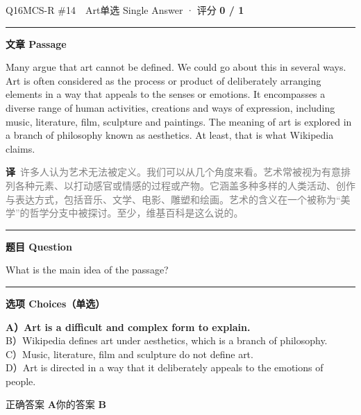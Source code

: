 \documentclass[11pt]{article}
\newcommand{\ptesub}[1]{%
  \par\needspace{2\baselineskip}\smallskip
  {\color{cAccent}\rule[-0.2ex]{3pt}{1.05em}}\hspace{6pt}%
  {\bfseries\color{cHead}#1}\par\nopagebreak\smallskip}
\newcommand{\zh}[1]{{\footnotesize\textcolor{cNote}{\textbf{译}}\ \textcolor{gray}{#1}}}
\begin{document}
\begin{qblock}{Q16\quad MCS-R \#14\ \ Art}{单选 Single Answer · 评分 \textcolor{cAccent}{\bfseries 0 / 1}}
\ptesub{文章 Passage}
\begin{promptbox}
Many argue that art cannot be defined. We could go about this in several ways. Art is often considered as the process or product of deliberately arranging elements in a way that appeals to the senses or emotions. It encompasses a diverse range of human activities, creations and ways of expression, including music, literature, film, sculpture and paintings. The meaning of art is explored in a branch of philosophy known as aesthetics. At least, that is what Wikipedia claims.
\end{promptbox}
\zh{许多人认为艺术无法被定义。我们可以从几个角度来看。艺术常被视为有意排列各种元素、以打动感官或情感的过程或产物。它涵盖多种多样的人类活动、创作与表达方式，包括音乐、文学、电影、雕塑和绘画。艺术的含义在一个被称为“美学”的哲学分支中被探讨。至少，维基百科是这么说的。}
\ptesub{题目 Question}
\begin{notebox}\small What is the main idea of the passage?\end{notebox}
\ptesub{选项 Choices（单选）}
{\small
{\color{cFix}\textbf{A）Art is a difficult and complex form to explain.}}\\
B）Wikipedia defines art under aesthetics, which is a branch of philosophy.\\
C）Music, literature, film and sculpture do not define art.\\
D）Art is directed in a way that it deliberately appeals to the emotions of people.}
\smallskip\par
{\small 正确答案 \textcolor{cFix}{\bfseries A}\qquad 你的答案 {\color{cWrong}\bfseries B}}
\end{qblock}
\end{document}
